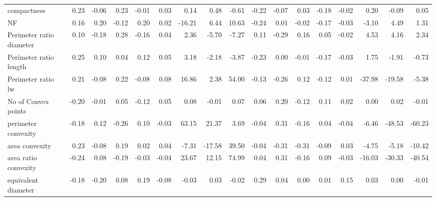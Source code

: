 \documentclass{article}
\begin{document}
\begin{table}[!ht]
{\begin{tabular}{lrrrrrrrrrrrrrrrr}
compactness                                                                 & 0.23  & -0.06 & 0.23  & -0.01 & 0.03  & 0.14      & 0.48      & -0.61      & -0.22 & -0.07 & 0.03  & -0.18 & -0.02 & 0.20      & -0.09    & 0.05      \\
NF                                                                          & 0.16  & 0.20  & -0.12 & 0.20  & 0.02  & -16.21      & 6.44       & 10.63        & -0.24 & 0.01  & -0.02 & -0.17 & -0.03 & -3.10      & 4.49       & 1.31        \\
Perimeter ratio diameter                                                    & 0.10  & -0.18 & 0.28  & -0.16 & 0.04  & 2.36       & -5.70      & -7.27       & 0.11  & -0.29 & 0.16  & 0.05  & -0.02 & 4.53       & 4.16       & 2.34        \\
Perimeter ratio length                                                      & 0.25  & 0.10  & 0.04  & 0.12  & 0.05  & 3.18       & -2.18      & -3.87       & -0.23 & 0.00  & -0.01 & -0.17 & -0.03 & 1.75       & -1.91      & -0.73      \\
Perimeter ratio lw                                                          & 0.21  & -0.08 & 0.22  & -0.08 & 0.08  & 16.86       & 2.38       & 54.00        & -0.13 & -0.26 & 0.12  & -0.12 & 0.01  & -37.98      & -19.58      & -5.38       \\
No of Convex points                                                         & -0.20 & -0.01 & 0.05  & -0.12 & 0.05  & 0.08     & -0.01    & 0.07      & 0.06  & 0.20  & -0.12 & 0.11  & 0.02  & 0.00    & 0.02     & -0.01    \\
perimeter convexity                                                         & -0.18 & 0.12  & -0.26 & 0.10  & -0.03 & 63.15       & 21.37       & 3.69       & -0.04 & 0.31  & -0.16 & 0.04  & -0.04 & -6.46      & -48.53      & -60.23       \\
area convexity                                                              & 0.23  & -0.08 & 0.19  & 0.02  & 0.04  & -7.31      & -17.58     & 39.50        & -0.04 & -0.31 & -0.31 & -0.09 & 0.03  & -4.75      & -5.18      & -10.42       \\
area ratio convexity                                                        & -0.24 & 0.08  & -0.19 & -0.03 & -0.04 & 23.67       & 12.15       & 74.99        & 0.04  & 0.31  & -0.16 & 0.09  & -0.03 & -16.03      & -30.33      & -40.54       \\
equivalent diameter                                                         & -0.18 & -0.20 & 0.08  & 0.19  & -0.08 & -0.03    & 0.03     & -0.02     & 0.29  & 0.04  & 0.00  & 0.01  & 0.15  & 0.03     & 0.00   & -0.01    \\

\end{tabular}}
\end{table}
\end{document}
